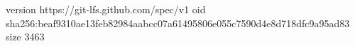 version https://git-lfs.github.com/spec/v1
oid sha256:beaf9310ae13feb82984aabcc07a61495806e055c7590d4e8d718dfc9a95ad83
size 3463
